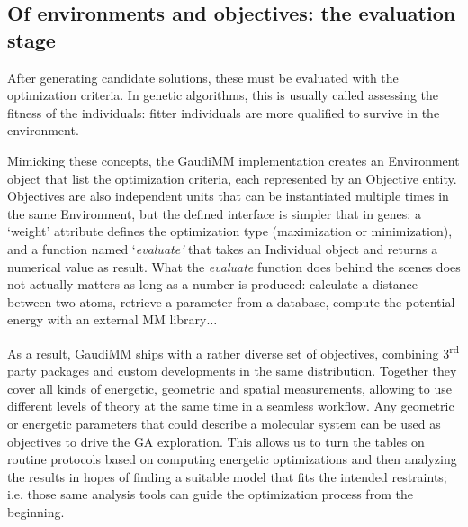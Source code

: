 


\subsection{Of environments and objectives: the evaluation stage}
After generating candidate solutions, these must be evaluated with the optimization criteria. In genetic algorithms, this is usually called assessing the fitness of the individuals: fitter individuals are more qualified to survive in the environment.

Mimicking these concepts, the GaudiMM implementation creates an Environment object that list the optimization criteria, each represented by an Objective entity. Objectives are also independent units that can be instantiated multiple times in the same Environment, but the defined interface is simpler that in genes: a ‘weight’ attribute defines the optimization type (maximization or minimization), and a function named ‘\textit{evaluate’} that takes an Individual object and returns a numerical value as result. What the \textit{evaluate} function does behind the scenes does not actually matters as long as a number is produced: calculate a distance between two atoms, retrieve a parameter from a database, compute the potential energy with an external MM library$ \ldots $

As a result, GaudiMM ships with a rather diverse set of objectives, combining 3\textsuperscript{rd} party packages and custom developments in the same distribution. Together they cover all kinds of energetic, geometric and spatial measurements, allowing to use different levels of theory at the same time in a seamless workflow. Any geometric or energetic parameters that could describe a molecular system can be used as objectives to drive the GA exploration. This allows us to turn the tables on routine protocols based on computing energetic optimizations and then analyzing the results in hopes of finding a suitable model that fits the intended restraints; i.e. those same analysis tools can guide the optimization process from the beginning.


